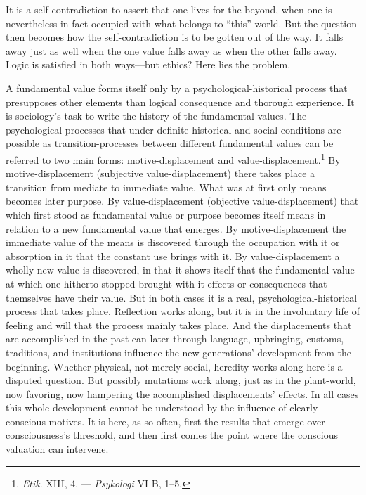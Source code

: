 \documentclass[12pt,a4paper]{book}
\newcommand{\opage}[1]{\marginnote{\footnotesize\textit{[#1]}}}
\begin{document}
\opage{361}It is a self-contradiction to assert that one lives for the beyond, when one is nevertheless in fact occupied
with what belongs to ``this'' world. But the question then becomes how the self-contradiction is to be gotten
out of the way. It falls away just as well when the one value falls away as when the other falls away. Logic is
satisfied in both ways---but ethics? Here lies the problem.

A fundamental value forms itself only by a psychological-historical process that presupposes other elements than logical consequence and thorough experience. It is sociology's task to write the history of the fundamental
values. The psychological processes that under definite historical and social conditions are possible as
transition-processes between different fundamental values can be referred to two main forms: motive-displacement
and value-displacement.\footnote{\emph{Etik}. XIII, 4. --- \emph{Psykologi} VI B, 1--5.} By motive-displacement
(subjective value-displacement) there takes place a transition from mediate to immediate value. What was at first only means becomes later purpose. By value-displacement (objective value-displacement) that which first stood as
fundamental value or purpose becomes itself means in relation to a new fundamental value that emerges. By
motive-displacement the immediate value of the means is discovered through the occupation with it or absorption
in it that the constant use brings with it. By value-displacement a wholly new value is discovered, in that it
shows itself that the fundamental value at which one hitherto stopped brought with it effects or consequences
that themselves have their value. But in both cases it is a real, psychological-historical process that takes
place. Reflection works along, but it is in the involuntary life of feeling and will that the process mainly
takes place. And the displacements that are accomplished in the past can later through language, upbringing,
customs, traditions, and institutions influence the new generations' development from the beginning. Whether
physical, not merely social, heredity works along here is a disputed question. But possibly mutations work along,
just as in the plant-world, now \opage{362}favoring, now hampering the accomplished displacements' effects. In all cases
this whole development cannot be understood by the influence of clearly conscious motives. It is here, as so
often, first the results that emerge over consciousness's threshold, and then first comes the point where the
conscious valuation can intervene.
\end{document}

